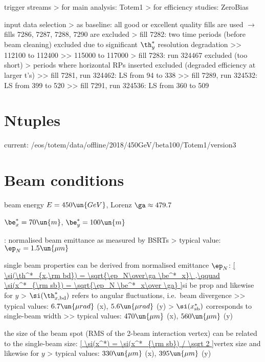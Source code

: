 \> trigger streams
\>> for main analysis: Totem1
\>> for efficiency studies: ZeroBias

\> input data selection
\>> as baseline: all good or excellent quality fills are used $\rightarrow$ fills 7286, 7287, 7288, 7290 are excluded
\>> fill 7282: two time periods (before beam cleaning) excluded due to significant $\th^*_y$ resolution degradation
\>>> 112100 to 112400
\>>> 115000 to 117000
\>> fill 7283: run 324467 excluded (too short)
\>> periods where horizontal RPs inserted excluded (degraded efficiency at larger t's)
\>>> fill 7281, run 324462: LS from 94 to 338
\>>> fill 7289, run 324532: LS from 399 to 520
\>>> fill 7291, run 324536: LS from 360 to 509



\chapter[ntuples]{Ntuples}

\> current: /eos/totem/data/offline/2018/450GeV/beta100/Totem1/version3



\chapter[beam-cond]{Beam conditions}

\> beam energy $E = 450\un{GeV}$, Lorenz $\ga \approx 479.7$

\> $\be^*_x = 70\un{m}$, $\be^*_y = 100\un{m}$

\> : normalised beam emittance as measured by BSRTs
\>> typical value: $\ep_N = 1.5\un{\mu m}$

\> single beam properties can be derived from normalised emittance $\ep_N$:
\eqref{
\si(\th^*_{x,\rm bd}) = \sqrt{\ep_N\over\ga \be^*_x}\ ,\qquad \si(x^*_{\rm sb}) = \sqrt{\ep_N \be^*_x\over \ga}
}{si be prop}
and likewise for $y$
\>> $\si(\th^*_{x,\rm bd})$ refers to angular fluctuations, i.e.~beam divergence
\>>> typical values: $6.7\un{\mu rad}$ (x), $5.6\un{\mu rad}$ (y)
\>> $\si(x^*_{\rm sb})$ corresponds to single-beam width
\>>> typical values: $470\un{\mu m}$ (x), $560\un{\mu m}$ (y)

\> the size of the beam spot (RMS of the 2-beam interaction vertex) can be related to the single-beam size:
\eqref{
\si(x^*) = \si(x^*_{\rm sb}) / \sqrt 2
}{vertex size}
and likewise for $y$
\>> typical values: $330\un{\mu m}$ (x), $395\un{\mu m}$ (y)

